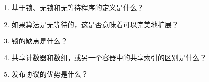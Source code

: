 \begin{enumerate}
\item 
基于锁、无锁和无等待程序的定义是什么？

\item 
如果算法是无等待的，这是否意味着可以完美地扩展？

\item 
锁的缺点是什么？

\item
共享计数器和数组，或另一个容器中的共享索引的区别是什么？

\item
发布协议的优势是什么？
\end{enumerate}